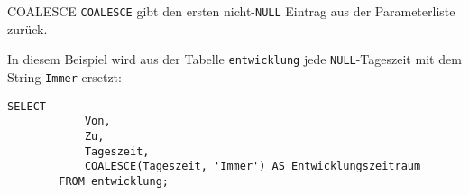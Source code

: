 \begin{sql}{COALESCE}
    \texttt{COALESCE} gibt den ersten nicht-\texttt{NULL} Eintrag aus der Parameterliste zurück.





    In diesem Beispiel wird aus der Tabelle \texttt{entwicklung} jede \texttt{NULL}-Tageszeit mit dem String \texttt{Immer} ersetzt:

    \begin{lstlisting}[language=mysql]
        SELECT
            Von,
            Zu,
            Tageszeit,
            COALESCE(Tageszeit, 'Immer') AS Entwicklungszeitraum
        FROM entwicklung;
    \end{lstlisting}


\end{sql}

